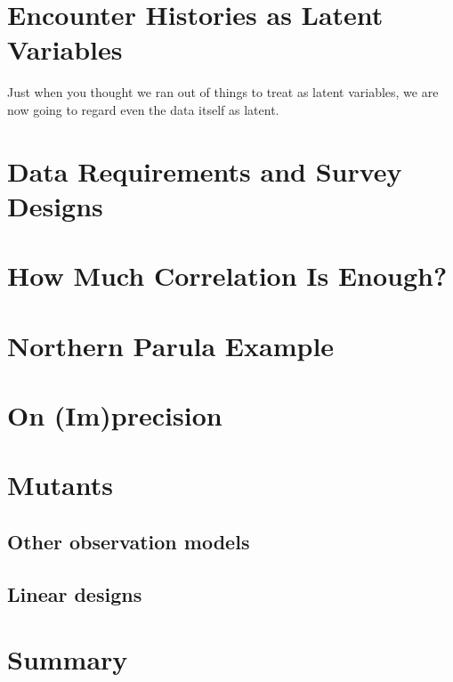 





\section{Encounter Histories as Latent Variables}

Just when you thought we ran out of things to treat as latent
variables, we are now going to regard even the data itself as latent.


\section{Data Requirements and Survey Designs}


\section{How Much Correlation Is Enough?}


\section{Northern Parula Example}



\section{On (Im)precision}




\section{Mutants}

\subsection{Other observation models}

\subsection{Linear designs}




\section{Summary}

